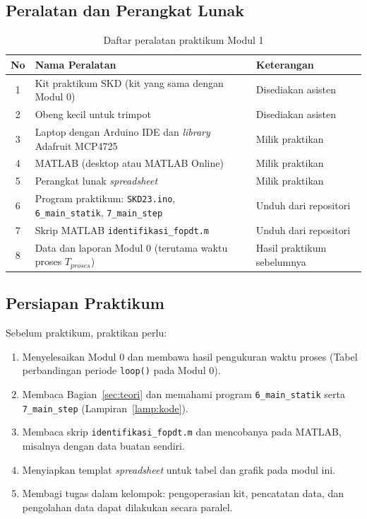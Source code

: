 \documentclass[11pt,a4paper]{article}
\newcommand{\sketch}{\texttt{SKD23.ino}}
\newcommand{\prog}[1]{\texttt{#1}}
\begin{document}
\subsection{Peralatan dan Perangkat Lunak}
\begin{table}[H]
	\centering
	\caption{Daftar peralatan praktikum Modul 1}
	\label{tab:peralatan}
	\begin{tabularx}{\textwidth}{|c|X|l|}
		\hline
		\textbf{No} & \textbf{Nama Peralatan}                                                    & \textbf{Keterangan}            \\
		\hline
		1           & Kit praktikum SKD (kit yang sama dengan Modul 0)                           & Disediakan asisten             \\
		2           & Obeng kecil untuk trimpot                                                  & Disediakan asisten             \\
		3           & Laptop dengan Arduino IDE dan \textit{library} Adafruit MCP4725            & Milik praktikan                \\
		4           & MATLAB (desktop atau MATLAB Online)                                        & Milik praktikan                \\
		5           & Perangkat lunak \textit{spreadsheet}                                       & Milik praktikan                \\
		6           & Program praktikum: \sketch, \prog{6\_main\_statik}, \prog{7\_main\_step}   & Unduh dari repositori          \\
		7           & Skrip MATLAB \prog{identifikasi\_fopdt.m}                                  & Unduh dari repositori          \\
		8           & Data dan laporan Modul 0 (terutama waktu proses $T_{proses}$)              & Hasil praktikum sebelumnya     \\
		\hline
	\end{tabularx}
\end{table}

\subsection{Persiapan Praktikum}
Sebelum praktikum, praktikan perlu:
\begin{enumerate}
	\item Menyelesaikan Modul 0 dan membawa hasil pengukuran waktu proses (Tabel perbandingan periode \texttt{loop()} pada Modul 0).
	\item Membaca Bagian~\ref{sec:teori} dan memahami program \prog{6\_main\_statik} serta \prog{7\_main\_step} (Lampiran~\ref{lamp:kode}).
	\item Membaca skrip \prog{identifikasi\_fopdt.m} dan mencobanya pada MATLAB, misalnya dengan data buatan sendiri.
	\item Menyiapkan templat \textit{spreadsheet} untuk tabel dan grafik pada modul ini.
	\item Membagi tugas dalam kelompok: pengoperasian kit, pencatatan data, dan pengolahan data dapat dilakukan secara paralel.
\end{enumerate}
\end{document}

